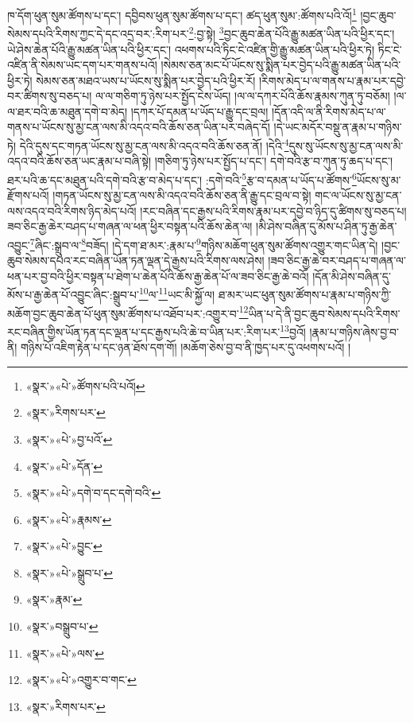 ཁ་དོག་ཕུན་སུམ་ཚོགས་པ་དང་། དབྱིབས་ཕུན་སུམ་ཚོགས་པ་དང་། ཚད་ཕུན་སུམ་:ཚོགས་པའི་འོ།\footnote{«སྣར་»«པེ་»ཚོགས་པའི་པའོ།} །བྱང་ཆུབ་སེམས་དཔའི་རིགས་ཀྱང་དེ་དང་འདྲ་བར་:རིག་པར་\footnote{«སྣར་»རིགས་པར་}:བྱ་སྟེ། \footnote{«སྣར་»«པེ་»བྱ་པའོ་}བྱང་ཆུབ་ཆེན་པོའི་རྒྱུ་མཚན་ཡིན་པའི་ཕྱིར་དང་། ཡེ་ཤེས་ཆེན་པོའི་རྒྱུ་མཚན་ཡིན་པའི་ཕྱིར་དང་། འཕགས་པའི་ཏིང་ངེ་འཛིན་གྱི་རྒྱུ་མཚན་ཡིན་པའི་ཕྱིར་ཏེ། ཏིང་ངེ་འཛིན་ནི་སེམས་ཡང་དག་པར་གནས་པའོ། །སེམས་ཅན་མང་པོ་ཡོངས་སུ་སྨིན་པར་བྱེད་པའི་རྒྱུ་མཚན་ཡིན་པའི་ཕྱིར་ཏེ། སེམས་ཅན་མཐའ་ཡས་པ་ཡོངས་སུ་སྨིན་པར་བྱེད་པའི་ཕྱིར་རོ། །རིགས་མེད་པ་ལ་གནས་པ་རྣམ་པར་དབྱེ་བར་ཚིགས་སུ་བཅད་པ། ལ་ལ་གཅིག་ཏུ་ཉེས་པར་སྤྱོད་ངེས་ཡོད། །ལ་ལ་དཀར་པོའི་ཆོས་རྣམས་ཀུན་ཏུ་བཅོམ། །ལ་ལ་ཐར་བའི་ཆ་མཐུན་དགེ་བ་མེད། །དཀར་པོ་དམན་པ་ཡོད་པ་རྒྱུ་དང་བྲལ། །དོན་འདི་ལ་ནི་རིགས་མེད་པ་ལ་གནས་པ་ཡོངས་སུ་མྱ་ངན་ལས་མི་འདའ་བའི་ཆོས་ཅན་ཡིན་པར་བཞེད་དོ། །དེ་ཡང་མདོར་བསྡུ་ན་རྣམ་པ་གཉིས་ཏེ། དེའི་དུས་དང་གཏན་ཡོངས་སུ་མྱ་ངན་ལས་མི་འདའ་བའི་ཆོས་ཅན་ནོ། །དེའི་\footnote{«སྣར་»«པེ་»དོན་}དུས་སུ་ཡོངས་སུ་མྱ་ངན་ལས་མི་འདའ་བའི་ཆོས་ཅན་ཡང་རྣམ་པ་བཞི་སྟེ། །གཅིག་ཏུ་ཉེས་པར་སྤྱོད་པ་དང་། དགེ་བའི་རྩ་བ་ཀུན་ཏུ་ཆད་པ་དང་། ཐར་པའི་ཆ་དང་མཐུན་པའི་དགེ་བའི་རྩ་བ་མེད་པ་དང་། :དགེ་བའི་\footnote{«སྣར་»«པེ་»དགེ་བ་དང་དགེ་བའི་}རྩ་བ་དམན་པ་ཡོད་པ་ཚོགས་\footnote{«སྣར་»«པེ་»རྣམས་}ཡོངས་སུ་མ་རྫོགས་པའོ། །གཏན་ཡོངས་སུ་མྱ་ངན་ལས་མི་འདའ་བའི་ཆོས་ཅན་ནི་རྒྱུ་དང་བྲལ་བ་སྟེ། གང་ལ་ཡོངས་སུ་མྱ་ངན་ལས་འདའ་བའི་རིགས་ཉིད་མེད་པའོ། །རང་བཞིན་དང་རྒྱས་པའི་རིགས་རྣམ་པར་དབྱེ་བ་ཉིད་དུ་ཚིགས་སུ་བཅད་པ། ཟབ་ཅིང་རྒྱ་ཆེར་བཤད་པ་གཞན་ལ་ཕན་ཕྱིར་བསྟན་པའི་ཆོས་ཆེན་ལ། །མི་ཤེས་བཞིན་དུ་མོས་པ་ཤིན་ཏུ་རྒྱ་ཆེན་འབྱུང་\footnote{«སྣར་»«པེ་»བྱུང་}ཞིང་:སྒྲུབ་ལ་\footnote{«སྣར་»«པེ་»སྒྲུབ་པ་}བཟོད། །དེ་དག་ཐ་མར་:རྣམ་པ་\footnote{«སྣར་»རྣམ་}གཉིས་མཆོག་ཕུན་སུམ་ཚོགས་འགྱུར་གང་ཡིན་དེ། །བྱང་ཆུབ་སེམས་དཔའ་རང་བཞིན་ཡོན་ཏན་ལྡན་དེ་རྒྱས་པའི་རིགས་ལས་ཤེས། །ཟབ་ཅིང་རྒྱ་ཆེ་བར་བཤད་པ་གཞན་ལ་ཕན་པར་བྱ་བའི་ཕྱིར་བསྟན་པ་ཐེག་པ་ཆེན་པོའི་ཆོས་རྒྱ་ཆེན་པོ་ལ་ཟབ་ཅིང་རྒྱ་ཆེ་བའོ། །དོན་མི་ཤེས་བཞིན་དུ་མོས་པ་རྒྱ་ཆེན་པོ་འབྱུང་ཞིང་:སྒྲུབ་པ་\footnote{«སྣར་»བསྒྲུབ་པ་}ལ་\footnote{«སྣར་»«པེ་»ལས་}ཡང་མི་སྐྱོ་ལ། ཐ་མར་ཡང་ཕུན་སུམ་ཚོགས་པ་རྣམ་པ་གཉིས་ཀྱི་མཆོག་བྱང་ཆུབ་ཆེན་པོ་ཕུན་སུམ་ཚོགས་པ་འཐོབ་པར་:འགྱུར་བ་\footnote{«སྣར་»«པེ་»འགྱུར་བ་གང་}ཡིན་པ་དེ་ནི་བྱང་ཆུབ་སེམས་དཔའི་རིགས་རང་བཞིན་གྱིས་ཡོན་ཏན་དང་ལྡན་པ་དང་རྒྱས་པའི་ཆེ་བ་ཡིན་པར་:རིག་པར་\footnote{«སྣར་»རིགས་པར་}བྱའོ། །རྣམ་པ་གཉིས་ཞེས་བྱ་བ་ནི། གཉིས་པོ་འཇིག་རྟེན་པ་དང་ཉན་ཐོས་དག་གོ། །མཆོག་ཅེས་བྱ་བ་ནི་ཁྱད་པར་དུ་འཕགས་པའོ། །
